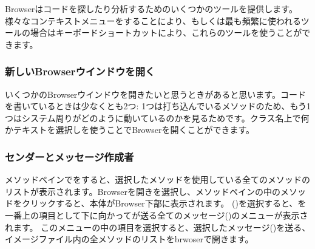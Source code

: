 \documentclass[a4paper,10pt,twoside]{book}
\begin{document}
Browserはコードを探したり分析するためのいくつかのツールを提供します。様々なコンテキストメニューを\actclick することにより、もしくは最も頻繁に使われるツールの場合はキーボードショートカットにより、これらのツールを使うことができます。

\subsubsection{新しいBrowserウインドウを開く}

いくつかのBrowserウインドウを開きたいと思うときがあると思います。コードを書いているときは少なくとも2つ: 1つは打ち込んでいるメソッドのため、もう1つはシステム周りがどのように動いているのかを見るためです。クラス名上で何かテキストを選択しを使うことでBrowserを開くことができます。


\subsubsection{センダーとメッセージ作成者}

メソッドペインでを\actclick すると、選択したメソッドを使用している全てのメソッドのリストが表示されます。Browserを開きを選択し、メソッドペインの中のメソッドをクリックすると、本体がBrowser下部に表示されます。  ()を選択すると、を一番上の項目として下に向かってが送る全てのメッセージ()のメニューが表示されます。 このメニューの中の項目を選択すると、選択したメッセージ()を送る、イメージファイル内の全メソッドのリストをbrwoserで開きます。

\end{document}
